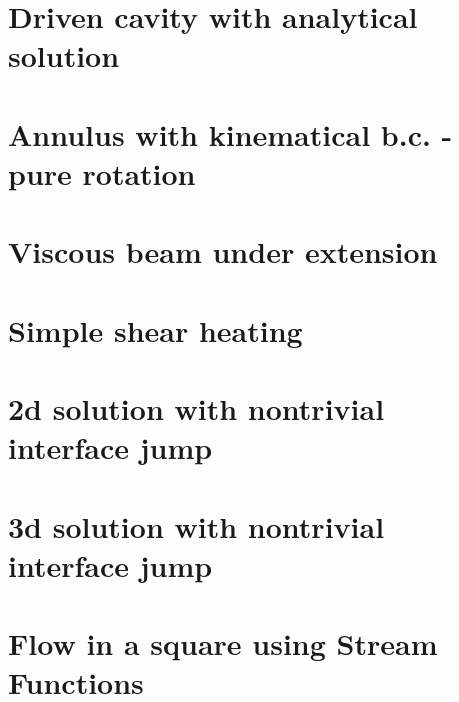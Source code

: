 \section{Driven cavity with analytical solution \label{sec:ldc_anal}}


\section{Annulus with kinematical b.c. - pure rotation} \label{ss:ankbc}


\section{Viscous beam under extension \label{ss:viscousbeamext}}


\section{Simple shear heating} \label{ss:shearheating} 


\section{2d solution with nontrivial interface jump} \label{ss:jump2D} 


\section{3d solution with nontrivial interface jump} \label{ss:jump3D} 


\section{Flow in a square using Stream Functions \label{ss:square_streamfct} }



